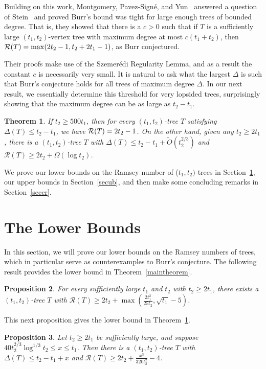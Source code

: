 \documentclass[11pt]{article}
\newtheorem{theorem}{Theorem}[section]
\newtheorem{prop}[theorem]{Proposition}
\begin{document}
Building on this work, Montgomery, Pavez-Sign\'{e}, and Yun~\cite{MPY} answered a question of Stein~\cite{S} and proved Burr's bound was tight for large enough trees of bounded degree. That is, they showed that there is a $c>0$ such that if $T$ is a sufficiently large $(t_1,t_2)$-vertex tree with maximum degree at most $c(t_1+t_2)$, then ${\cal R}(T)=\max(2t_2-1,t_2+2t_1-1)$, as Burr conjectured.

Their proofs make use of the Szemer\'edi Regularity Lemma, and as a result the constant $c$ is necessarily very small. It is natural to ask what the largest $\Delta$ is such that Burr's conjecture holds for all trees of maximum degree $\Delta$. In our next result, we essentially determine this threshold for very lopsided trees, surprisingly showing that the maximum degree can be as large as $t_2 - t_1$.

\begin{theorem}
 \label{maintheorem1}
 If $t_2 \ge 500 t_1$, then for every $(t_1, t_2)$-tree $T$ satisfying $\Delta(T) \le t_2 - t_1$, we have ${\cal R}(T) = 2t_2 - 1$. 
 On the other hand, given any $t_2 \ge 2t_1$, there is a $(t_1, t_2)$-tree $T$ with $\Delta(T) \le t_2 - t_1 +\tilde{O}(t_2^{2/3})$ and $\mathcal{R}(T) \ge 2t_2 + \Omega( \log t_2)$.
 \end{theorem}

We prove our lower bounds on the Ramsey number of ($t_1,t_2)$-trees in Section~\ref{seclb}, our upper bounds in Section~\ref{secub}, and then make some concluding remarks in Section~\ref{seccr}.
 
\section{The Lower Bounds}
\label{seclb} 
In this section, we will prove our lower bounds on the Ramsey numbers of trees, which in particular serve as counterexamples to Burr's conjecture. The following result provides the lower bound in Theorem~\ref{maintheorem}.

\begin{prop} \label{prop:main-lower-bound}
     For every sufficiently large $t_1$ and $t_2$ with  $t_2 \ge 2t_1$, there exists a $(t_1,t_2)$-tree $T$ with 
    ${\mathcal R}(T) \ge 2 t_2 + \max\left(\frac{2 t_1^2}{25 t_2},\sqrt{t_1} - 5 \right)$.
\end{prop}

This next proposition gives the lower bound in Theorem~\ref{maintheorem1}.

\begin{prop} \label{prop:bounded-degree-lower-bound}
    Let $t_2 \ge 2 t_1$ be sufficiently large, and suppose $40 t_2^{2/3} \log^{1/3} t_2 \le x \le t_1$. Then there is a $(t_1, t_2)$-tree $T$ with $\Delta(T) \le t_2 - t_1 + x$ and $\mathcal{R}(T) \ge 2t_2 + \frac{x^3}{320 t_2^2} - 4$.
\end{prop}
\end{document}
